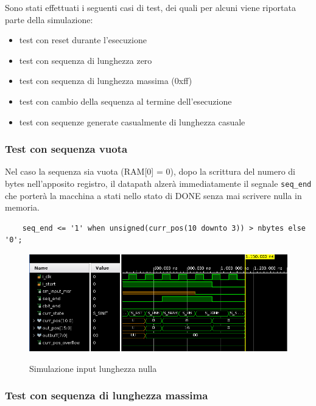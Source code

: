 \documentclass[12pt, a4paper]{article}
\begin{document}
\noindent Sono stati effettuati i seguenti casi di test, dei quali per alcuni viene riportata parte della simulazione: %

\begin{itemize}[itemsep=4pt, topsep=4pt]
    \item test con reset durante l'esecuzione
    \item test con sequenza di lunghezza zero
    \item test con sequenza di lunghezza massima (0xff)
    \item test con cambio della sequenza al termine dell'esecuzione
    \item test con sequenze generate casualmente di lunghezza casuale
\end{itemize}

\pagebreak

\subsubsection{Test con sequenza vuota}

Nel caso la sequenza sia vuota (RAM[0] = 0), dopo la scrittura del numero di bytes nell'apposito registro,
il datapath alzerà immediatamente il segnale \texttt{seq\_end} che porterà la macchina a stati
nello stato di DONE senza mai scrivere nulla in memoria.

\begin{verbatim}
    seq_end <= '1' when unsigned(curr_pos(10 downto 3)) > nbytes else '0';
\end{verbatim}

\begin{figure}[h!]
    \centering
    \includegraphics[scale=0.5]{sim_minlen_init.png}
    \label{img:sim_min_init}
    \caption{Simulazione input lunghezza nulla}
\end{figure}


\subsubsection{Test con sequenza di lunghezza massima}
\end{document}

